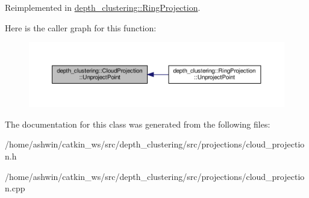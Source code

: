 Reimplemented in \hyperlink{classdepth__clustering_1_1RingProjection_a16cbf43e541e65560cb282c560b4efa7}{depth\+\_\+clustering\+::\+Ring\+Projection}.

Here is the caller graph for this function\+:\nopagebreak
\begin{figure}[H]
\begin{center}
\leavevmode
\includegraphics[width=350pt]{classdepth__clustering_1_1CloudProjection_ab552ac1dbb56e077679d9f0268c79a44_icgraph}
\end{center}
\end{figure}


The documentation for this class was generated from the following files\+:\begin{DoxyCompactItemize}
\item 
/home/ashwin/catkin\+\_\+ws/src/depth\+\_\+clustering/src/projections/cloud\+\_\+projection.\+h\item 
/home/ashwin/catkin\+\_\+ws/src/depth\+\_\+clustering/src/projections/cloud\+\_\+projection.\+cpp\end{DoxyCompactItemize}
